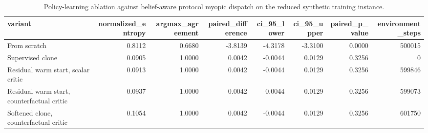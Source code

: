\begin{table}
\caption{Policy-learning ablation against belief-aware protocol myopic dispatch on the reduced synthetic training instance.}
\label{tab:policy-ablation}
\begin{tabular}{lrrrrrrr}
\toprule
variant & normalized_entropy & argmax_agreement & paired_difference & ci_95_lower & ci_95_upper & paired_p_value & environment_steps \\
\midrule
From scratch & 0.8112 & 0.6680 & -3.8139 & -4.3178 & -3.3100 & 0.0000 & 500015 \\
Supervised clone & 0.0905 & 1.0000 & 0.0042 & -0.0044 & 0.0129 & 0.3256 & 0 \\
Residual warm start, scalar critic & 0.0913 & 1.0000 & 0.0042 & -0.0044 & 0.0129 & 0.3256 & 599846 \\
Residual warm start, counterfactual critic & 0.0937 & 1.0000 & 0.0042 & -0.0044 & 0.0129 & 0.3256 & 599073 \\
Softened clone, counterfactual critic & 0.1054 & 1.0000 & 0.0042 & -0.0044 & 0.0129 & 0.3256 & 601750 \\
\bottomrule
\end{tabular}
\end{table}
